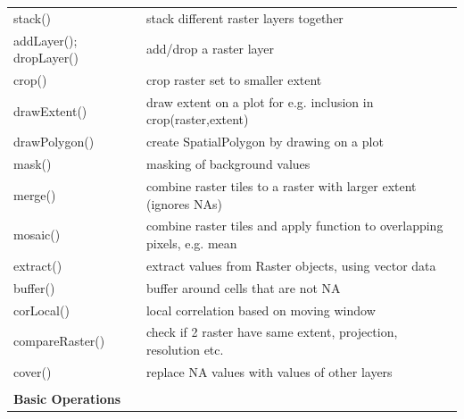 \documentclass[10pt,landscape]{article}
\begin{document}
\begin{multicols}{3}
\begin{tabular}{@{}p{\the\MyLen}%
                @{}p{\linewidth-\the\MyLen}@{}}
stack() & stack different raster layers together \\
addLayer(); dropLayer()	& add/drop a raster layer\\
crop() 		& crop raster set to smaller extent  \\
drawExtent()	& draw extent on a plot for e.g. inclusion in crop(raster,extent)\\
drawPolygon()	& create SpatialPolygon by drawing on a plot\\
mask() 		& masking of background values \\
merge() & combine raster tiles to a raster with larger extent (ignores NAs)\\
mosaic() & combine raster tiles  and apply function to overlapping pixels, e.g. mean\\
extract() 	& extract values from Raster objects, using vector data  \\
buffer()	& buffer around cells that are not NA	\\
corLocal()	& local correlation based on moving window\\
compareRaster()	& check if 2 raster have same extent, projection, resolution etc.\\
cover()		&replace NA values with values of other layers\\
& \\

\bigskip

\textbf{Basic Operations} & \\


\end{tabular}
\end{multicols}
\end{document}
